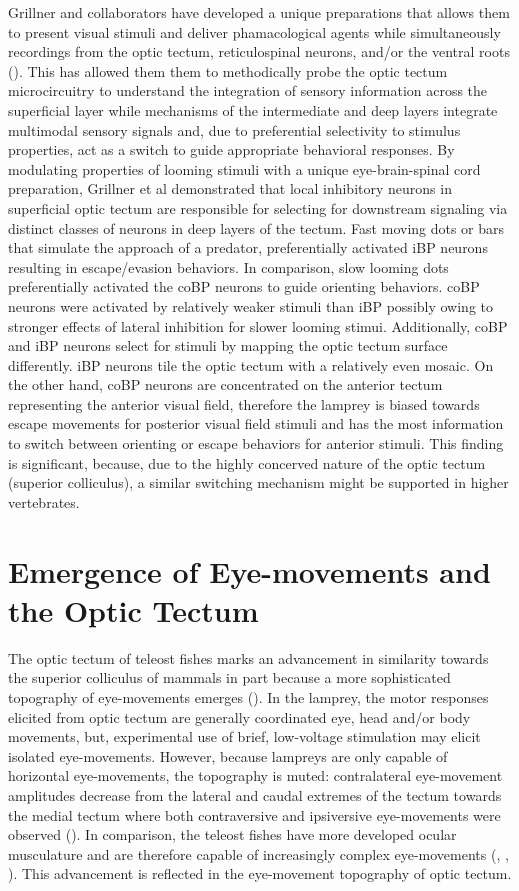 \documentclass{ar-1col}
\begin{document}
{Grillner and collaborators have developed a unique preparations that allows them to present visual stimuli and deliver phamacological agents while simultaneously recordings from the optic tectum, reticulospinal neurons, and/or the ventral roots (\cite{kardamakis2015tectal}). This has allowed them them to methodically probe the optic tectum microcircuitry to understand the integration of sensory information across the superficial layer while mechanisms of the intermediate and deep layers integrate multimodal sensory signals and, due to preferential selectivity to stimulus properties, act as a switch to guide appropriate behavioral responses. By modulating properties of looming stimuli with a unique eye-brain-spinal cord preparation, Grillner et al demonstrated that local inhibitory neurons in superficial optic tectum are responsible for selecting for downstream signaling via distinct classes of neurons in deep layers of the tectum. Fast moving dots or bars that simulate the approach of a predator, preferentially activated iBP neurons resulting in escape/evasion behaviors. In comparison, slow looming dots preferentially activated the coBP neurons to guide orienting behaviors. coBP neurons were activated by relatively weaker stimuli than iBP possibly owing to stronger effects of lateral inhibition for slower looming stimui. Additionally, coBP and iBP neurons select for stimuli by mapping the optic tectum surface differently. iBP neurons tile the optic tectum with a relatively even mosaic. On the other hand, coBP neurons are concentrated on the anterior tectum representing the anterior visual field, therefore the lamprey is biased towards escape movements for posterior visual field stimuli and has the most information to switch between orienting or escape behaviors for anterior stimuli. This finding is significant, because, due to the highly concerved nature of the optic tectum (superior colliculus), a similar switching mechanism might be supported in higher vertebrates.

\section{Emergence of Eye-movements and the Optic Tectum}
The optic tectum of teleost fishes marks an advancement in similarity towards the superior colliculus of mammals in part because a more sophisticated topography of eye-movements emerges (\cite{land2015eye}). In the lamprey, the motor responses elicited from optic tectum are generally coordinated eye, head and/or body movements, but, experimental use of brief, low-voltage stimulation may elicit isolated eye-movements. However, because lampreys are only capable of horizontal eye-movements, the topography is muted: contralateral eye-movement amplitudes decrease from the lateral and caudal extremes of the tectum towards the medial tectum where both contraversive and ipsiversive eye-movements were observed (\cite{saitoh2007tectal}). In comparison, the teleost fishes have more developed ocular musculature and are therefore capable of increasingly complex eye-movements (\cite{graf1978eye}, \cite{torres1992afferents}, \cite{northmore2011optic}). This advancement is reflected in the eye-movement topography of optic tectum.  

}
\end{document}
